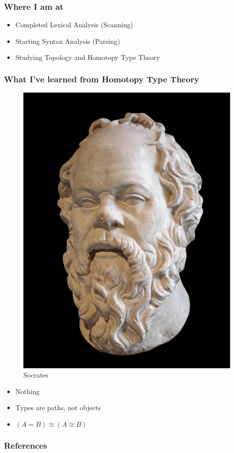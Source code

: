 \documentclass{beamer}
\begin{document}
\begin{frame}
\frametitle{Where I am at}
\begin{itemize}
    \item Completed Lexical Analysis (Scanning)
    \item Starting Syntax Analysis (Parsing)
    \item Studying Topology and Homotopy Type Theory \cite{hott}
\end{itemize}
\end{frame}

\begin{frame}
  \frametitle{What I've learned from Homotopy Type Theory}
  \begin{figure}
    \centering
    \includegraphics[scale=0.05]{socrates.jpg}
    \caption{Socrates}
    \label{fig:enter-label}
\end{figure}
    \begin{itemize}
    \item Nothing
    \item Types are paths, not objects
      \item \( (A = B) \cong (A \cong B) \)
    \end{itemize}
\end{frame}

\begin{frame}[allowframebreaks]
\frametitle{References}


\end{frame}
\end{document}

